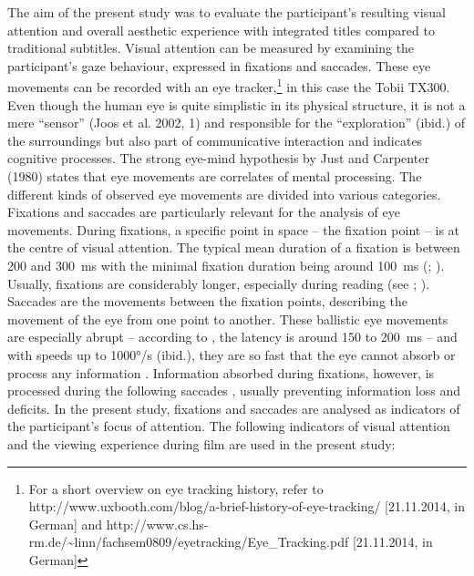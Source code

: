 \documentclass[output=paper]{langsci/langscibook}
\begin{document}
The aim of the present study was to evaluate the participant’s resulting visual attention and overall aesthetic experience with integrated titles compared to traditional subtitles. Visual attention can be measured by examining the participant’s gaze behaviour, expressed in fixations and saccades. These eye movements can be recorded with an eye tracker,\footnote{For a short overview on eye tracking history, refer to http://www.uxbooth.com/blog/a-brief-history-of-eye-tracking/ [21.11.2014, in German] and http://www.cs.hs-rm.de/\~{}linn/fachsem0809/eyetracking/Eye\_Tracking.pdf [21.11.2014, in German]} in this case the Tobii TX300. Even though the human eye is quite simplistic in its physical structure, it is not a mere “sensor” (Joos et al. 2002, 1) and responsible for the “exploration” (ibid.) of the surroundings but also part of communicative interaction and indicates cognitive processes. The strong eye-mind hypothesis by Just and Carpenter (1980) states that eye movements are correlates of mental processing. The different kinds of observed eye movements are divided into various categories. Fixations and saccades are particularly relevant for the analysis of eye movements. During fixations, a specific point in space – the fixation point – is at the centre of visual attention. The typical mean duration of a fixation is between 200 and 300~ms with the minimal fixation duration being around 100~ms (\citet[373]{rayner1998}; \citet[2]{flothow2009}). Usually, fixations are considerably longer, especially during reading (see \citet{rayner1998}; \citet{jakobsen2008}). Saccades are the movements between the fixation points, describing the movement of the eye from one point to another. These ballistic eye movements are especially abrupt – according to \citet[17]{joos2005}, the latency is around 150 to 200~ms – and with speeds up to 1000°/s (ibid.), they are so fast that the eye cannot absorb or process any information \citep[4]{flothow2009}. Information absorbed during fixations, however, is processed during the following saccades \citep[6]{kowler2006}, usually preventing information loss and deficits. In the present study, fixations and saccades are analysed as indicators of the participant’s focus of attention. The following indicators of visual attention and the viewing experience during film are used in the present study:
\end{document}
